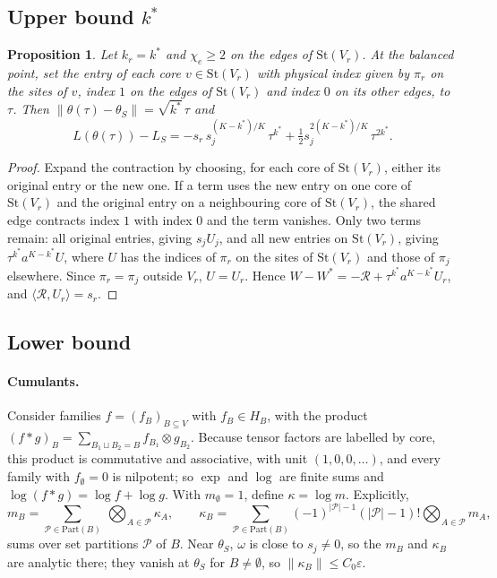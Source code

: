 \documentclass[11pt]{article}
\newtheorem{proposition}{Proposition}
\theoremstyle{definition}
\newcommand{\St}{\mathrm{St}}
\newcommand{\ip}[2]{\langle #1,#2\rangle}
\begin{document}
\subsection{Upper bound $k^*$}

\begin{proposition}\label{prop:route}
Let $k_r=k^*$ and $\chi_e\ge2$ on the edges of $\St(V_r)$. At the balanced point, set the entry of each core $v\in\St(V_r)$
with physical index given by $\pi_r$ on the sites of $v$, index $1$ on the edges of $\St(V_r)$ and index $0$ on its other
edges, to $\tau$. Then $\lVert\theta(\tau)-\theta_S\rVert=\sqrt{k^*}\,\tau$ and
\[
L(\theta(\tau))-L_S=-s_r\,s_j^{(K-k^*)/K}\,\tau^{k^*}+\tfrac12s_j^{2(K-k^*)/K}\,\tau^{2k^*}.
\]
\end{proposition}
\begin{proof}
Expand the contraction by choosing, for each core of $\St(V_r)$, either its original entry or the new one. If a term
uses the new entry on one core of $\St(V_r)$ and the original entry on a neighbouring core of $\St(V_r)$, the shared
edge contracts index $1$ with index $0$ and the term vanishes. Only two terms remain: all original entries, giving
$s_jU_j$, and all new entries on $\St(V_r)$, giving $\tau^{k^*}a^{K-k^*}U$, where $U$ has the indices of $\pi_r$ on the
sites of $\St(V_r)$ and those of $\pi_j$ elsewhere. Since $\pi_r=\pi_j$ outside $V_r$, $U=U_r$. Hence
$W-W^*=-\mathcal R+\tau^{k^*}a^{K-k^*}U_r$, and $\ip{\mathcal R}{U_r}=s_r$.
\end{proof}

\subsection{Lower bound}

\paragraph{Cumulants.} Consider families $f=(f_B)_{B\subseteq V}$ with $f_B\in H_B$, with the product
$(f*g)_B=\sum_{B_1\sqcup B_2=B}f_{B_1}\otimes g_{B_2}$. Because tensor factors are labelled by core, this product is commutative
and associative, with unit $(1,0,0,\dots)$, and every family with $f_\emptyset=0$ is nilpotent; so $\exp$ and $\log$ are finite
sums and $\log(f*g)=\log f+\log g$. With $m_\emptyset=1$, define $\kappa=\log m$. Explicitly,
\[
m_B=\sum_{\mathcal P\in\mathrm{Part}(B)}\ \bigotimes_{A\in\mathcal P}\kappa_A,\qquad
\kappa_B=\sum_{\mathcal P\in\mathrm{Part}(B)}(-1)^{\lvert\mathcal P\rvert-1}(\lvert\mathcal P\rvert-1)!\bigotimes_{A\in\mathcal P}m_A ,
\]
sums over set partitions $\mathcal P$ of $B$. Near $\theta_S$, $\omega$ is close to $s_j\ne0$, so the $m_B$ and $\kappa_B$ are
analytic there; they vanish at $\theta_S$ for $B\ne\emptyset$, so $\lVert\kappa_B\rVert\le C_0\varepsilon$.
\end{document}
